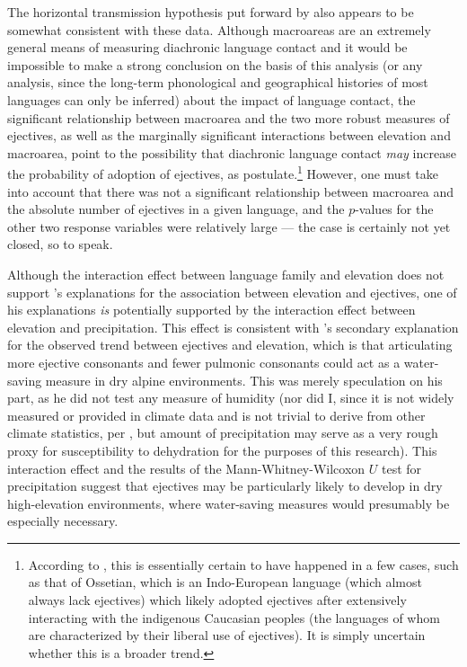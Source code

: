 \documentclass{article}
\begin{document}
The horizontal transmission hypothesis put forward by \textcite{urban2021} also appears to be somewhat consistent with these data. Although macroareas are an extremely general means of measuring diachronic language contact and it would be impossible to make a strong conclusion on the basis of this analysis (or any analysis, since the long-term phonological and geographical histories of most languages can only be inferred) about the impact of language contact, the significant relationship between macroarea and the two more robust measures of ejectives, as well as the marginally significant interactions between elevation and macroarea, point to the possibility that diachronic language contact \emph{may} increase the probability of adoption of ejectives, as \textcite{urban2021} postulate.\footnote{According to \textcite{urban2021}, this is essentially certain to have happened in a few cases, such as that of Ossetian, which is an Indo-European language (which almost always lack ejectives) which likely adopted ejectives after extensively interacting with the indigenous Caucasian peoples (the languages of whom are characterized by their liberal use of ejectives). It is simply uncertain whether this is a broader trend.} However, one must take into account that there was not a significant relationship between macroarea and the absolute number of ejectives in a given language, and the $p$-values for the other two response variables were relatively large --- the case is certainly not yet closed, so to speak. 

Although the interaction effect between language family and elevation does not support \textcite{everett2013}'s explanations for the association between elevation and ejectives, one of his explanations \emph{is} potentially supported by the interaction effect between elevation and precipitation. This effect is consistent with \textcite{everett2013}'s secondary explanation for the observed trend between ejectives and elevation, which is that articulating more ejective consonants and fewer pulmonic consonants could act as a water-saving measure in dry alpine environments. This was merely speculation on his part, as he did not test any measure of humidity (nor did I, since it is not widely measured or provided in climate data and is not trivial to derive from other climate statistics, per \textcite{eccel2012}, but amount of precipitation may serve as a very rough proxy for susceptibility to dehydration for the purposes of this research). This interaction effect and the results of the Mann-Whitney-Wilcoxon $U$ test for precipitation suggest that ejectives may be particularly likely to develop in dry high-elevation environments, where water-saving measures would presumably be especially necessary.
\end{document}
